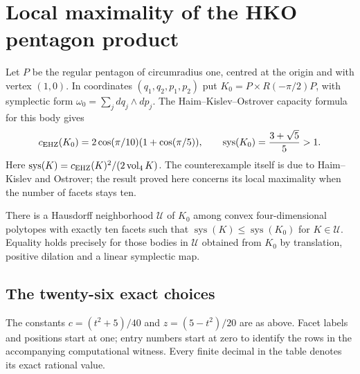 \clearpage
\section[HKO Local Maximality]{Local maximality of the HKO pentagon product}
\label{sec:hko-local-maximum}
Let $P$ be the regular pentagon of circumradius one, centred at the origin
and with vertex $(1,0)$. In coordinates $(q_1,q_2,p_1,p_2)$ put
$K_0=P\times R(-\pi/2)P$, with symplectic form
$\omega_0=\sum_j dq_j\wedge dp_j$.
The Haim--Kislev--Ostrover capacity formula~\cite{HaimKislevOstrover2024} for this body gives
\[
 c_{\rm EHZ}(K_0)=2\cos(\pi/10)(1+\cos(\pi/5)),\qquad
 \operatorname{sys}(K_0)=\frac{3+\sqrt5}{5}>1.
\]
Here $\operatorname{sys}(K)=c_{\rm EHZ}(K)^2/(2\operatorname{vol}_4 K)$.
The counterexample itself is due to Haim--Kislev and Ostrover; the result
proved here concerns its local maximality when the number of facets stays ten.
\begin{theorem}\label{thm:hko-ten-facet-local-maximum}
There is a Hausdorff neighborhood $\mathcal U$ of $K_0$ among convex
four-dimensional polytopes with exactly ten facets such that
$\operatorname{sys}(K)\leq\operatorname{sys}(K_0)$ for $K\in\mathcal U$.
Equality holds precisely for those bodies in $\mathcal U$ obtained from
$K_0$ by translation, positive dilation and a linear symplectic map.
\end{theorem}



\clearpage
\subsection*{The twenty-six exact choices}
\label{page:hko-exact-choices}
The constants $c=(t^2+5)/40$ and $z=(5-t^2)/20$ are as above.
Facet labels and positions start at one; entry numbers start at zero to
identify the rows in the accompanying computational witness.
Every finite decimal in the table denotes its exact rational value.
\begingroup
\small\renewcommand{\arraystretch}{1.25}
\renewcommand{\baselinestretch}{1.2}\selectfont

\endgroup
